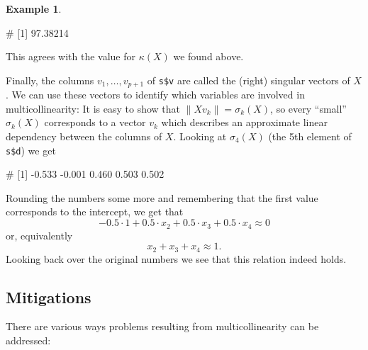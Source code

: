 \documentclass[
  a4paper,
]{article}
\newenvironment{Shaded}{\begin{snugshade}}{\end{snugshade}}
\newcommand{\DecValTok}[1]{\textcolor[rgb]{0.00,0.00,0.81}{#1}}
\newcommand{\FunctionTok}[1]{\textcolor[rgb]{0.00,0.00,0.00}{#1}}
\newcommand{\NormalTok}[1]{#1}
\newcommand{\SpecialCharTok}[1]{\textcolor[rgb]{0.00,0.00,0.00}{#1}}
\theoremstyle{definition}
\theoremstyle{definition}
\newtheorem{example}{Example}[section]
\theoremstyle{definition}
\theoremstyle{definition}
\theoremstyle{remark}
\begin{document}
\begin{example}
\begin{Shaded}
\begin{Highlighting}[]
\NormalTok{\# [1] 97.38214}
\end{Highlighting}
\end{Shaded}

This agrees with the value for \(\kappa(X)\) we found above.

Finally, the columns \(v_1, \ldots, v_{p+1}\) of \texttt{s\$v} are called the (right)
singular vectors of \(X\). We can use these vectors to identify which variables
are involved in multicollinearity: It is easy to show that \(\| X v_k \| = \sigma_k(X)\), so every ``small'' \(\sigma_k(X)\) corresponds to a vector \(v_k\)
which describes an approximate linear dependency between the columns of \(X\).
Looking at \(\sigma_4(X)\) (the 5th element of \texttt{s\$d}) we get

\begin{Shaded}
\end{Shaded}

\begin{Shaded}
\begin{Highlighting}[]
\NormalTok{\# [1] {-}0.533 {-}0.001  0.460  0.503  0.502}
\end{Highlighting}
\end{Shaded}

Rounding the numbers some more and remembering that the first
value corresponds to the intercept, we get that
\begin{equation*}
  -0.5 \cdot 1 + 0.5 \cdot x_2 + 0.5 \cdot x_3 + 0.5 \cdot x_4
  \approx 0
\end{equation*}
or, equivalently
\begin{equation*}
  x_2 + x_3 + x_4
  \approx 1.
\end{equation*}
Looking back over the original numbers we see that this relation
indeed holds.
\end{example}

\hypertarget{mitigations}{%
\subsection{Mitigations}\label{mitigations}}

There are various ways problems resulting from multicollinearity can
be addressed:
\end{document}
